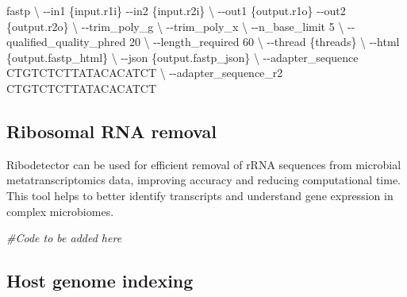 \documentclass[
]{book}
\newenvironment{Shaded}{\begin{snugshade}}{\end{snugshade}}
\newcommand{\AttributeTok}[1]{\textcolor[rgb]{0.77,0.63,0.00}{#1}}
\newcommand{\CommentTok}[1]{\textcolor[rgb]{0.56,0.35,0.01}{\textit{#1}}}
\newcommand{\DataTypeTok}[1]{\textcolor[rgb]{0.13,0.29,0.53}{#1}}
\newcommand{\ExtensionTok}[1]{#1}
\newcommand{\NormalTok}[1]{#1}
\begin{document}
\begin{Shaded}
\begin{Highlighting}[]
\ExtensionTok{fastp} \DataTypeTok{\textbackslash{}}
      \AttributeTok{{-}{-}in1}\NormalTok{ \{input.r1i\} }\AttributeTok{{-}{-}in2}\NormalTok{ \{input.r2i\} }\DataTypeTok{\textbackslash{}}
      \AttributeTok{{-}{-}out1}\NormalTok{ \{output.r1o\} }\AttributeTok{{-}{-}out2}\NormalTok{ \{output.r2o\} }\DataTypeTok{\textbackslash{}}
      \AttributeTok{{-}{-}trim\_poly\_g} \DataTypeTok{\textbackslash{}}
      \AttributeTok{{-}{-}trim\_poly\_x} \DataTypeTok{\textbackslash{}}
      \AttributeTok{{-}{-}n\_base\_limit}\NormalTok{ 5 }\DataTypeTok{\textbackslash{}}
      \AttributeTok{{-}{-}qualified\_quality\_phred}\NormalTok{ 20 }\DataTypeTok{\textbackslash{}}
      \AttributeTok{{-}{-}length\_required}\NormalTok{ 60 }\DataTypeTok{\textbackslash{}}
      \AttributeTok{{-}{-}thread}\NormalTok{ \{threads\} }\DataTypeTok{\textbackslash{}}
      \AttributeTok{{-}{-}html}\NormalTok{ \{output.fastp\_html\} }\DataTypeTok{\textbackslash{}}
      \AttributeTok{{-}{-}json}\NormalTok{ \{output.fastp\_json\} }\DataTypeTok{\textbackslash{}}
      \AttributeTok{{-}{-}adapter\_sequence}\NormalTok{ CTGTCTCTTATACACATCT }\DataTypeTok{\textbackslash{}}
      \AttributeTok{{-}{-}adapter\_sequence\_r2}\NormalTok{ CTGTCTCTTATACACATCT}
\end{Highlighting}
\end{Shaded}

\hypertarget{ribosomal-rna-removal-1}{%
\subsection*{Ribosomal RNA removal}\label{ribosomal-rna-removal-1}}

Ribodetector can be used for efficient removal of rRNA sequences from microbial metatranscriptomics data, improving accuracy and reducing computational time. This tool helps to better identify transcripts and understand gene expression in complex microbiomes.

\begin{Shaded}
\begin{Highlighting}[]
\CommentTok{\#Code to be added here}
\end{Highlighting}
\end{Shaded}

\hypertarget{host-genome-indexing}{%
\subsection*{Host genome indexing}\label{host-genome-indexing}}
\end{document}

